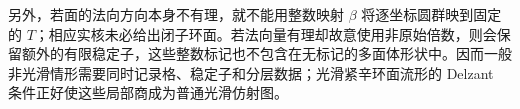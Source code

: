 另外，若面的法向方向本身不有理，就不能用整数映射 \(\beta\) 将逐坐标圆群映到固定的 \(T\)；相应实核未必给出闭子环面。若法向量有理却故意使用非原始倍数，则会保留额外的有限稳定子，这些整数标记也不包含在无标记的多面体形状中。因而一般非光滑情形需要同时记录格、稳定子和分层数据；光滑紧辛环面流形的 Delzant 条件正好使这些局部商成为普通光滑仿射图。
